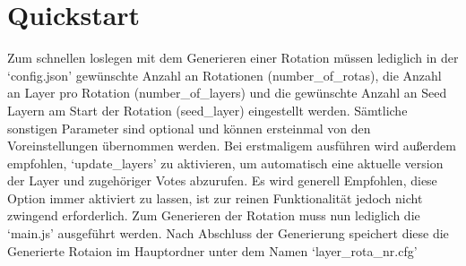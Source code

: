 \section{Quickstart}
Zum schnellen loslegen mit dem Generieren einer Rotation müssen lediglich in der `config.json' gewünschte Anzahl an Rotationen (number\_of\_rotas),
die Anzahl an Layer pro Rotation (number\_of\_layers) und die gewünschte Anzahl an Seed Layern am Start der Rotation (seed\_layer) eingestellt werden.
Sämtliche sonstigen Parameter sind optional und können ersteinmal von den Voreinstellungen übernommen werden.
\newline
Bei erstmaligem ausführen wird außerdem empfohlen, `update\_layers' zu aktivieren, um automatisch eine aktuelle version der Layer und zugehöriger Votes abzurufen.
Es wird generell Empfohlen, diese Option immer aktiviert zu lassen, ist zur reinen Funktionalität jedoch nicht zwingend erforderlich.
\newline
Zum Generieren der Rotation muss nun lediglich die `main.js' ausgeführt werden.
Nach Abschluss der Generierung speichert diese die Generierte Rotaion im Hauptordner unter dem Namen `layer\_{rota\_nr}.cfg'

